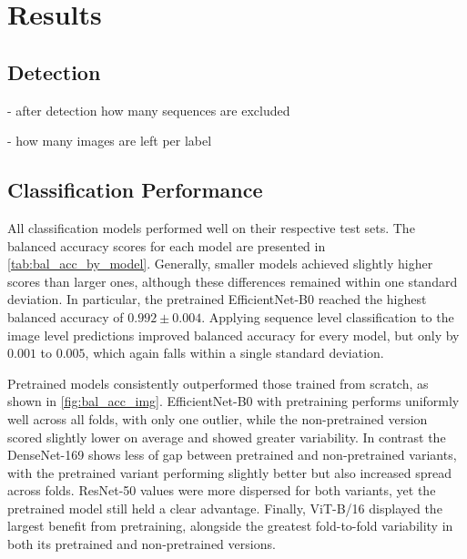 

\section{Results}
\label{results}

    \subsection{Detection}

    - after detection how many sequences are excluded

    - how many images are left per label

    \subsection{Classification Performance}

    All classification models performed well on their respective test sets.
    The balanced accuracy scores for each model are presented in \autoref{tab:bal_acc_by_model}.
    Generally, smaller models achieved slightly higher scores than larger ones, although these differences remained within one standard deviation.
    In particular, the pretrained EfficientNet-B0 reached the highest balanced accuracy of \(0.992\pm0.004\).
    Applying sequence level classification to the image level predictions improved balanced accuracy for every model, but only by \(0.001\) to \(0.005\), which again falls within a single standard deviation.

    Pretrained models consistently outperformed those trained from scratch, as shown in \autoref{fig:bal_acc_img}.
    EfficientNet-B0 with pretraining performs uniformly well across all folds, with only one outlier, while the non-pretrained version scored slightly lower on average and showed greater variability.
    In contrast the DenseNet-169 shows less of gap between pretrained and non-pretrained variants, with the pretrained variant performing slightly better but also increased spread across folds.
    ResNet-50 values were more dispersed for both variants, yet the pretrained model still held a clear advantage. 
    Finally, ViT-B/16 displayed the largest benefit from pretraining, alongside the greatest fold-to-fold variability in both its pretrained and non-pretrained versions.

